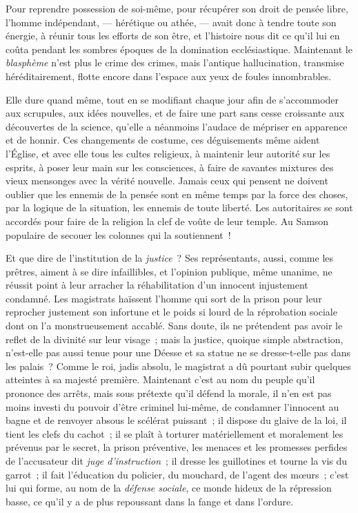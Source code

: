\documentclass[french,twoside]{book} %
\begin{document}
Pour reprendre possession de soi-même, pour récupérer son droit de pensée libre, l’homme indépendant, — hérétique ou athée, — avait donc à tendre toute son énergie, à réunir tous les efforts de son être, et l’histoire nous dit ce qu’il lui en coûta pendant les sombres époques de la domination ecclésiastique.  Maintenant le \emph{blasphème} n’est plus le crime des crimes, mais l’antique hallucination, transmise héréditairement, flotte encore dans l’espace aux yeux de foules innombrables.\par
Elle dure quand même, tout en se modifiant chaque jour afin de s’accommoder aux scrupules, aux idées nouvelles, et de faire une part sans cesse croissante aux découvertes de la science, qu’elle a néanmoins l’audace de mépriser en apparence et de honnir. Ces changements de costume, ces déguisements même aident l’Église, et avec elle tous les cultes religieux, à maintenir leur autorité sur les esprits, à poser leur main sur les consciences, à faire de savantes mixtures des vieux mensonges avec la vérité nouvelle. Jamais ceux qui pensent ne doivent  oublier que les ennemis de la pensée sont en même temps par la force des choses, par la logique de la situation, les ennemis de toute liberté. Les autoritaires se sont accordés pour faire de la religion la clef de voûte de leur temple. Au Samson populaire de secouer les colonnes qui la soutiennent !\par
Et que dire de l’institution de la \emph{justice} ? Ses représentants, aussi, comme les prêtres, aiment à se dire infaillibles, et l’opinion publique, même unanime, ne réussit point à leur arracher la réhabilitation d’un innocent injustement condamné. Les magistrats haïssent l’homme qui sort de la prison pour leur reprocher justement son infortune et le poids si lourd de la réprobation sociale dont on l’a monstrueusement accablé.  Sans doute, ils ne prétendent pas avoir le reflet de la divinité sur leur visage ; mais la justice, quoique simple abstraction, n’est-elle pas aussi tenue pour une Déesse et sa statue ne se dresse-t-elle pas dans les palais ? Comme le roi, jadis absolu, le magistrat a dû pourtant subir quelques atteintes à sa majesté première. Maintenant c’est au nom du peuple qu’il prononce des arrêts, mais sous prétexte qu’il défend la morale, il n’en est pas moins investi du pouvoir d’être criminel lui-même, de condamner l’innocent au bagne et de renvoyer absous le scélérat puissant ; il dispose du glaive de la loi, il tient les clefs du cachot ; il se plaît à torturer matériellement et moralement les prévenus par le secret, la prison préventive, les menaces  et les promesses perfides de l’accusateur dit \emph{juge d’instruction} ; il dresse les guillotines et tourne la vis du garrot ; il fait l’éducation du policier, du mouchard, de l’agent des mœurs ; c’est lui qui forme, au nom de la \emph{défense sociale}, ce monde hideux de la répression basse, ce qu’il y a de plus repoussant dans la fange et dans l’ordure.\par
\end{document}
